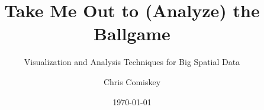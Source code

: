 \documentclass{beamer}
\title{Take Me Out to (Analyze) the Ballgame}
\subtitle{Visualization and Analysis Techniques for Big Spatial Data}
\author{Chris Comiskey}
\institute{Oregon State University}
\date{\today}
\begin{document}
\begin{frame}
  \titlepage
\end{frame}

% 
% 
% 
% 
% 
\end{document}
